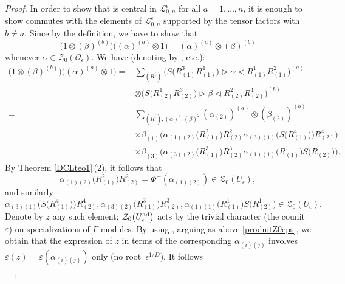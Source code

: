 \documentclass[pdftex]{sigma}
\numberwithin{equation}{section}
\theoremstyle{definition}
\newcommand{\e}{\epsilon}
\newcommand{\Ll}{{\mathcal L}}
\newcommand{\Oo}{{\mathcal O}}
\begin{document}
\begin{proof}
In order to show that \smash{$\mathcal{Z}_0(\Oo_\e)^{(a)}$} is central in $\Ll_{0,n}^\e$ for all $a=1,\dots,n$, it is enough to show \smash{$\mathcal{Z}_0(\Oo_\e)^{(a)}$} commutes with the elements of $\Ll_{0,n}^\e$ supported by the tensor factors \smash{$\bigl(\Ll_{0,1}^\e\bigr)^{(b)}$} with $b\ne a$. Since  by the definition, we have to show that \[\big(1\!\otimes\! (\beta)^{(b)}\big)\big((\alpha)^{(a)} \!\otimes \!1\big) = (\alpha)^{(a)}\!\otimes\! (\beta)^{(b)}\] whenever $\alpha\!\in \!\mathcal{Z}_0(\Oo_\e)$. We have (denoting \smash{$ \sum_{(\alpha),(\alpha),(\alpha),(\alpha)}$} by ,  etc.):
\begin{align*}
\big(1\otimes (\beta)^{(b)}\big) \big((\alpha)^{(a)} \otimes 1\big) ={}&\sum_{\scriptscriptstyle(R^i)} \big(S\big(R^3_{(1)}R^4_{(1)}\big)\rhd \alpha \lhd R^1_{(1)}R^2_{(1)}\big)^{(a)} \\
&\otimes \big(S\big(R^1_{(2)}R^3_{(2)}\big) \rhd \beta \lhd R^2_{(2)}R^4_{(2)}\big)^{(b)}
\\
={}&\sum_{\scriptscriptstyle(R^i),(\alpha)^4,(\beta)^2} (\alpha_{(2)})^{(a)}\otimes (\beta_{(2)})^{(b)}\\
& \times \beta_{(1)}\big(\alpha_{(1)(2)}\big(R^2_{(1)}\big) R^2_{(2)} \alpha_{(3)(1)}\big(S\big(R^4_{(1)}\big)\big) R^4_{(2)}\big)\\
& \times \beta_{(3)}\big(\alpha_{(3)(2)}\big(R^3_{(1)}\big)R^3_{(2)} \alpha_{(1)(1)}\big(R^1_{(1)}\big) S\big(R^1_{(2)}\big)\big).
\end{align*}
By Theorem \ref{DCLteo1}\,(2), it follows that
\[
\alpha_{(1)(2)}\big(R^2_{(1)}\big) R^2_{(2)} = \Phi^+(\alpha_{(1)(2)}) \in \mathcal{Z}_0(U_\epsilon),
\]
 and similarly
\[
\alpha_{(3)(1)}\big(S\big(R^4_{(1)}\big)\big) R^4_{(2)}, \alpha_{(3)(2)}\big(R^3_{(1)}\big)R^3_{(2)}, \alpha_{(1)(1)}\big(R^1_{(1)}\big) S\big(R^1_{(2)}\big) \in \mathcal{Z}_0(U_\epsilon).
\]
 Denote by $z$ any such element; ${\mathcal Z}_0\big(U_\epsilon^{\rm ad}\big)$ acts by the trivial character (the counit $\varepsilon$) on specializations of $\Gamma$-modules. By using \cite[Proposition 6.2]{BR}, arguing as above \eqref{produitZ0eps}, we obtain that the expression of $z$ in terms of the corresponding $\alpha_{(i)(j)}$ involves $\varepsilon(z)= \varepsilon(\alpha_{(i)(j)})$ only \big(no root~$\epsilon^{1/D}$\big). It follows
\begin{gather*}

\end{gather*}
\end{proof}
\end{document}
